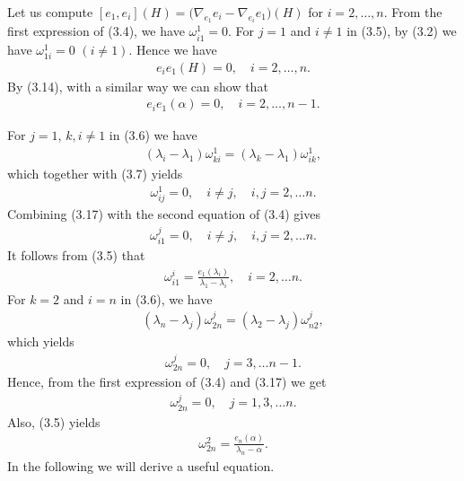 \documentclass[twoside,reqno,A4]{amsart}
\theoremstyle{definition}
\theoremstyle{remark}
\numberwithin{equation}{section}
\begin{document}
Let us compute
$[e_1,e_i](H)=\big(\nabla_{e_1}e_i-\nabla_{e_i}e_1\big)(H)$ for
$i=2, \ldots, n$. From the first expression of (3.4), we have
$\omega_{i1}^1=0$. For $j=1$ and $i\neq1$ in (3.5), by (3.2) we have
$\omega_{1i}^1=0$ $(i\neq1)$. Hence we have
\begin{eqnarray}
e_ie_1(H)=0,\quad i=2, \ldots, n.
\end{eqnarray}
By (3.14), with a similar way we can show that
\begin{eqnarray}
e_ie_1(\alpha)=0,\quad i=2, \ldots, n-1.
\end{eqnarray}

 For $j=1$, $k, i\neq1$ in (3.6) we have
\begin{eqnarray*}
(\lambda_i-\lambda_1)\omega_{ki}^1=(\lambda_k-\lambda_1)\omega_{ik}^1,
\end{eqnarray*}
which together with (3.7) yields
\begin{eqnarray}
\omega_{ij}^1=0, \quad i\neq j,\quad i, j=2,\ldots n.
\end{eqnarray}
Combining (3.17) with the second equation of (3.4) gives
\begin{eqnarray}
\omega_{i1}^j=0, \quad i\neq j,\quad i, j=2,\ldots n.
\end{eqnarray}
It follows from (3.5) that
\begin{eqnarray}
\omega_{i1}^i=\frac{e_1(\lambda_i)}{\lambda_1-\lambda_i}, \quad
i=2,\ldots n.
\end{eqnarray}
For $k=2$ and $i=n$ in (3.6), we have
\begin{eqnarray*}
(\lambda_n-\lambda_j)\omega_{2n}^j=(\lambda_2-\lambda_j)\omega_{n2}^j,
\end{eqnarray*}
which yields
\begin{eqnarray*}
\omega_{2n}^j=0, \quad j=3,\ldots n-1.
\end{eqnarray*}
Hence, from the first expression of (3.4) and (3.17) we get
\begin{eqnarray}
\omega_{2n}^j=0, \quad j=1, 3,\ldots n.
\end{eqnarray}
Also, (3.5) yields
\begin{eqnarray}
\omega_{2n}^2=\frac{e_n(\alpha)}{\lambda_n-\alpha}.
\end{eqnarray}
In the following we will derive a useful equation.
\end{document}
